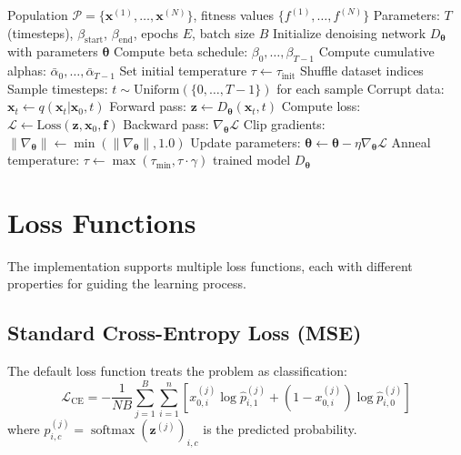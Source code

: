 \documentclass[11pt,a4paper]{article}
\newcommand{\vx}{\mathbf{x}}
\newcommand{\vtheta}{\boldsymbol{\theta}}
\DeclareMathOperator{\softmax}{softmax}
\begin{document}
\begin{algorithm}[H]
\caption{Learning Discrete Dendiff-Gumbel Model}
\label{alg:learning}
\begin{algorithmic}[1]
\Require Population $\mathcal{P} = \{\vx^{(1)}, \ldots, \vx^{(N)}\}$, fitness values $\{f^{(1)}, \ldots, f^{(N)}\}$
\Require Parameters: $T$ (timesteps), $\beta_{\text{start}}$, $\beta_{\text{end}}$, epochs $E$, batch size $B$
\State Initialize denoising network $D_\vtheta$ with parameters $\vtheta$
\State Compute beta schedule: $\beta_0, \ldots, \beta_{T-1}$
\State Compute cumulative alphas: $\bar{\alpha}_0, \ldots, \bar{\alpha}_{T-1}$
\State Set initial temperature $\tau \gets \tau_{\text{init}}$
    \State Shuffle dataset indices
        \State Sample timesteps: $t \sim \text{Uniform}(\{0, \ldots, T-1\})$ for each sample
        \State Corrupt data: $\vx_t \gets q(\vx_t | \vx_0, t)$ 
        \State Forward pass: $\mathbf{z} \gets D_\vtheta(\vx_t, t)$ 
        \State Compute loss: $\mathcal{L} \gets \text{Loss}(\mathbf{z}, \vx_0, \mathbf{f})$
        \State Backward pass: $\nabla_\vtheta \mathcal{L}$
        \State Clip gradients: $\|\nabla_\vtheta\| \gets \min(\|\nabla_\vtheta\|, 1.0)$
        \State Update parameters: $\vtheta \gets \vtheta - \eta \nabla_\vtheta \mathcal{L}$
    \EndFor
    \State Anneal temperature: $\tau \gets \max(\tau_{\min}, \tau \cdot \gamma)$
\EndFor
\State \Return trained model $D_\vtheta$
\end{algorithmic}
\end{algorithm}

\section{Loss Functions}

The implementation supports multiple loss functions, each with different properties for guiding the learning process.

\subsection{Standard Cross-Entropy Loss (MSE)}

The default loss function treats the problem as classification:
\begin{equation}
    \mathcal{L}_{\text{CE}} = -\frac{1}{NB}\sum_{j=1}^{B}\sum_{i=1}^{n} \left[x_{0,i}^{(j)} \log \hat{p}_{i,1}^{(j)} + (1-x_{0,i}^{(j)}) \log \hat{p}_{i,0}^{(j)}\right]
\end{equation}
where $\hat{p}_{i,c}^{(j)} = \softmax(\mathbf{z}^{(j)})_{i,c}$ is the predicted probability.
\end{document}
